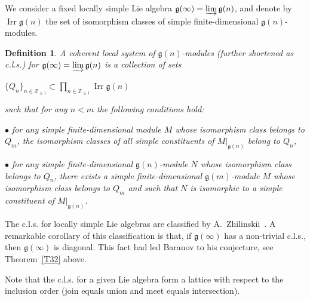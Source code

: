 \documentclass{emsprocart}
\newtheorem{definition}[theorem]{Definition}
\begin{document}
We consider a fixed locally simple Lie algebra $\mathfrak g(\infty)=\varinjlim \mathfrak g(n)$, and denote by $\operatorname{Irr} \mathfrak g(n)$ the set of isomorphism classes of simple finite-dimensional $\mathfrak g(n)$-modules.
\begin{definition}{\it A coherent local system of $\mathfrak g(n)$-modules} (further shortened as {\it c.l.s.}) for $\mathfrak g(\infty)=\varinjlim\mathfrak g(n)$ is a collection of sets \begin{center}$\{Q_n\}_{n\in\mathbb Z_{\ge1}}\subset\prod_{n\in\mathbb Z_{\ge1}}\operatorname{Irr}\mathfrak g(n)$\end{center} such that for any $n<m$ the following conditions hold:

$\bullet$ for any simple finite-dimensional module $M$ whose isomorphism class belongs to $Q_m$, the isomorphism classes of all simple constituents of $M|_{\mathfrak g(n)}$ belong to $Q_n$,

$\bullet$ for any simple finite-dimensional $\mathfrak g(n)$-module $N$ whose isomorphism class belongs to $Q_n$, there exists a simple finite-dimensional $\mathfrak g(m)$-module $M$ whose isomorphism class belongs to $Q_m$ and such that $N$ is isomorphic to a simple constituent of $M|_{\mathfrak g(n)}$.
\end{definition}

The c.l.s. for locally simple Lie algebras are classified by A.~Zhilinskii~\cite{Zh3}. A remarkable corollary of this classification is that, if $\mathfrak g(\infty)$ has a non-trivial c.l.s., then $\mathfrak g(\infty)$ is diagonal. This fact had led Baranov to his conjecture, see Theorem~\ref{T32} above.

Note that the c.l.s. for a given Lie algebra form a lattice with respect to the inclusion order (join equals union and meet equals intersection).

\end{document}
